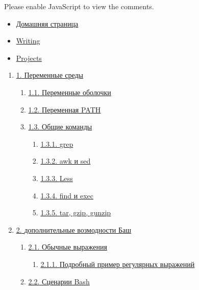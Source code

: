 \documentclass{report}
\begin{document}
\hypertarget{disqus_thread}{}
Please enable JavaScript to view the comments.

\hypertarget{footer-post-container}{}
\hypertarget{footer-post}{}
\hypertarget{nav-footer}{}
\begin{itemize}
\tightlist
\item
  \href{http://zachgoll.github.io}{Домашняя страница}
\item
  \href{blog/archives/}{Writing}
\item
  \href{portfolio}{Projects}
\end{itemize}

\hypertarget{toc-footer}{}
\begin{enumerate}
\tightlist
\item
  \protect\hyperlink{Environment-variables}{{1.} {Переменные среды}}

  \begin{enumerate}
  \tightlist
  \item
    \protect\hyperlink{Shell-Variables}{{1.1.} {Переменные оболочки}}
  \item
    \protect\hyperlink{PATH-variable}{{1.2.} {Переменная PATH}}
  \item
    \protect\hyperlink{Common-Commands}{{1.3.} {Общие команды}}

    \begin{enumerate}
    \tightlist
    \item
      \protect\hyperlink{grep}{{1.3.1.} {grep}}
    \item
      \protect\hyperlink{awk-and-sed}{{1.3.2.} {awk и sed}}
    \item
      \protect\hyperlink{Less}{{1.3.3.} {Less}}
    \item
      \protect\hyperlink{find-and-exec}{{1.3.4.} {find и exec}}
    \item
      \protect\hyperlink{tar-gzip-gunzip}{{1.3.5.} {tar, gzip, gunzip}}
    \end{enumerate}
  \end{enumerate}
\item
  \protect\hyperlink{Advanced-Bash}{{2.} {дополнительные возмодности
  Баш}}

  \begin{enumerate}
  \tightlist
  \item
    \protect\hyperlink{Regular-Expressions}{{2.1.} {Обычные выражения}}

    \begin{enumerate}
    \tightlist
    \item
      \protect\hyperlink{Detailed-Example-Regular-Expression}{{2.1.1.}
      {Подробный пример регулярных выражений}}
    \end{enumerate}
  \item
    \protect\hyperlink{Bash-Scripting}{{2.2.} {Сценарии Bash}}


\end{enumerate}
\end{enumerate}
\end{document}
